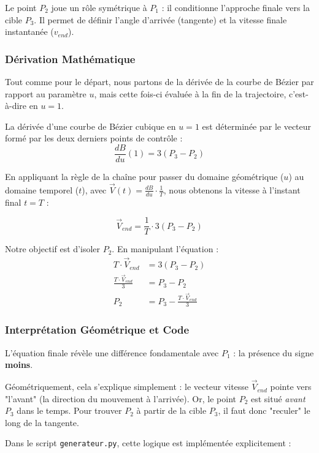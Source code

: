 \documentclass[12pt]{report}
\theoremstyle{plain}
\begin{document}
Le point $P_2$ joue un rôle symétrique à $P_1$ : il conditionne l'approche finale vers la cible $P_3$. Il permet de définir l'angle d'arrivée (tangente) et la vitesse finale instantanée ($v_{end}$).

\subsubsection{Dérivation Mathématique}
Tout comme pour le départ, nous partons de la dérivée de la courbe de Bézier par rapport au paramètre $u$, mais cette fois-ci évaluée à la fin de la trajectoire, c'est-à-dire en $u=1$.

La dérivée d'une courbe de Bézier cubique en $u=1$ est déterminée par le vecteur formé par les deux derniers points de contrôle :
\begin{equation}
    \frac{dB}{du}(1) = 3(P_3 - P_2)
\end{equation}

En appliquant la règle de la chaîne pour passer du domaine géométrique ($u$) au domaine temporel ($t$), avec $\vec{V}(t) = \frac{dB}{du} \cdot \frac{1}{T}$, nous obtenons la vitesse à l'instant final $t=T$ :

\begin{equation}
    \vec{V}_{end} = \frac{1}{T} \cdot 3(P_3 - P_2)
\end{equation}

Notre objectif est d'isoler $P_2$. En manipulant l'équation :
\begin{align*}
    T \cdot \vec{V}_{end} &= 3(P_3 - P_2) \\
    \frac{T \cdot \vec{V}_{end}}{3} &= P_3 - P_2 \\
    P_2 &= P_3 - \frac{T \cdot \vec{V}_{end}}{3}
\end{align*}

\subsubsection{Interprétation Géométrique et Code}
L'équation finale révèle une différence fondamentale avec $P_1$ : la présence du signe \textbf{moins}.

Géométriquement, cela s'explique simplement : le vecteur vitesse $\vec{V}_{end}$ pointe vers "l'avant" (la direction du mouvement à l'arrivée). Or, le point $P_2$ est situé \textit{avant} $P_3$ dans le temps. Pour trouver $P_2$ à partir de la cible $P_3$, il faut donc "reculer" le long de la tangente.

Dans le script \texttt{generateur.py}, cette logique est implémentée explicitement :
\end{document}
